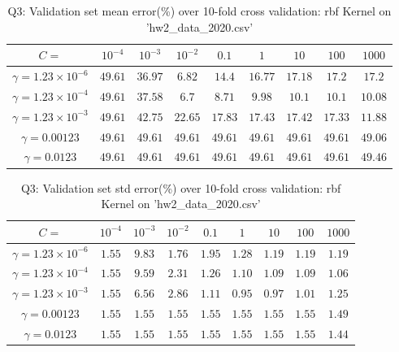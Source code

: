 \begin{table}[!ht]
	\centering
	\caption{Q3: Validation set mean error(\%) over 10-fold cross validation: rbf Kernel on 'hw2\_data\_2020.csv'}
	\begin{tabular}[t]{ccccccccc} 
		\hline
		$C=$ 						& $10^{-4}$ & $10^{-3}$ & $10^{-2}$ & $0.1$ 	& $1$ 		& $10$ 		& $100$ 	& $1000$\\ [0.5ex] 
		\hline
		$\gamma=1.23\times 10^{-6}$ & $49.61$ 	& $36.97$ 	& $6.82$ 	& $14.4$ 	& $16.77$ 	& $17.18$ 	& $17.2$ 	& $17.2$\\
		$\gamma=1.23\times 10^{-4}$ & $49.61$ 	& $37.58$ 	& $6.7$ 	& $8.71$ 	& $9.98$ 	& $10.1$ 	& $10.1$ 	& $10.08$\\
		$\gamma=1.23\times 10^{-3}$ & $49.61$ 	& $42.75$ 	& $22.65$ 	& $17.83$ 	& $17.43$ 	& $17.42$ 	& $17.33$ 	& $11.88$\\
		$\gamma=0.00123$ 			& $49.61$ 	& $49.61$ 	& $49.61$ 	& $49.61$ 	& $49.61$ 	& $49.61$ 	& $49.61$ 	& $49.06$\\
		$\gamma=0.0123$ 			& $49.61$ 	& $49.61$ 	& $49.61$ 	& $49.61$ 	& $49.61$ 	& $49.61$ 	& $49.61$ 	& $49.46$\\[1ex]
		\hline
	\end{tabular}
	\label{tbl:q3_rbf_val_mean}
\end{table}
\begin{table}[!ht]
	\centering
	\caption{Q3: Validation set std error(\%) over 10-fold cross validation: rbf Kernel on 'hw2\_data\_2020.csv'}
	\begin{tabular}[t]{ccccccccc} 
		\hline
		$C=$ 						& $10^{-4}$ & $10^{-3}$ & $10^{-2}$ & $0.1$ 	& $1$ 		& $10$ 		& $100$ 	& $1000$\\ [0.5ex] 
		\hline
		$\gamma=1.23\times 10^{-6}$ & $1.55$ 	& $9.83$ 	& $1.76$ 	& $1.95$ 	& $1.28$ 	& $1.19$ 	& $1.19$ 	& $1.19$\\
		$\gamma=1.23\times 10^{-4}$ & $1.55$ 	& $9.59$ 	& $2.31$ 	& $1.26$ 	& $1.10$ 	& $1.09$ 	& $1.09$ 	& $1.06$\\
		$\gamma=1.23\times 10^{-3}$ & $1.55$ 	& $6.56$ 	& $2.86$ 	& $1.11$ 	& $0.95$ 	& $0.97$ 	& $1.01$ 	& $1.25$\\
		$\gamma=0.00123$ 			& $1.55$ 	& $1.55$ 	& $1.55$ 	& $1.55$ 	& $1.55$ 	& $1.55$ 	& $1.55$ 	& $1.49$\\
		$\gamma=0.0123$ 			& $1.55$ 	& $1.55$ 	& $1.55$ 	& $1.55$ 	& $1.55$ 	& $1.55$ 	& $1.55$ 	& $1.44$\\[1ex]
		\hline
	\end{tabular}
	\label{tbl:q3_rbf_val_std}
\end{table}
